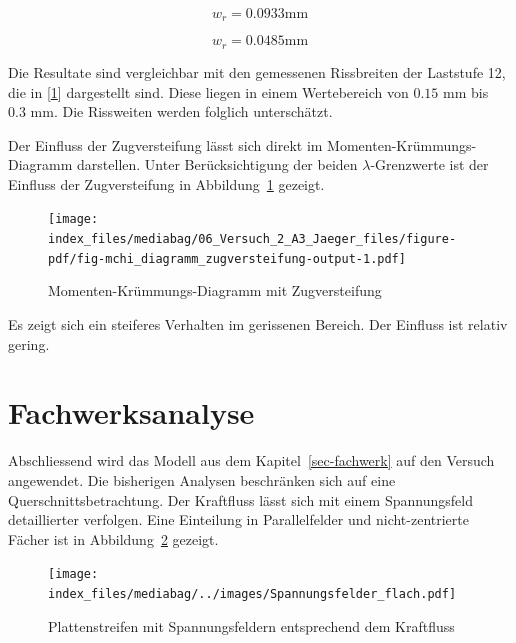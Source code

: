 \documentclass[
  12pt,
  letterpaper,
  egregdoesnotlikesansseriftitles]{scrreprt}
\begin{document}
\begin{equation}w_{r} = 0.0933 \text{mm}\end{equation}

\begin{equation}w_{r} = 0.0485 \text{mm}\end{equation}

Die Resultate sind vergleichbar mit den gemessenen Rissbreiten der
Laststufe 12, die in {[}\protect\hyperlink{ref-Jaeger2006}{1}{]}
dargestellt sind. Diese liegen in einem Wertebereich von
\(0.15 \text{ mm}\) bis \(0.3 \text{ mm}\). Die Rissweiten werden
folglich unterschätzt.

Der Einfluss der Zugversteifung lässt sich direkt im
Momenten-Krümmungs-Diagramm darstellen. Unter Berücksichtigung der
beiden \(\lambda\)-Grenzwerte ist der Einfluss der Zugversteifung in
Abbildung~\ref{fig-mchi_diagramm_zugversteifung} gezeigt.

\begin{figure}[H]

{\centering \texttt{[image: index\_files/mediabag/06\_Versuch\_2\_A3\_Jaeger\_files/figure-pdf/fig-mchi\_diagramm\_zugversteifung-output-1.pdf]}

}

\caption{\label{fig-mchi_diagramm_zugversteifung}Momenten-Krümmungs-Diagramm
mit Zugversteifung}

\end{figure}

Es zeigt sich ein steiferes Verhalten im gerissenen Bereich. Der
Einfluss ist relativ gering.

\hypertarget{fachwerksanalyse}{%
\section{Fachwerksanalyse}\label{fachwerksanalyse}}

Abschliessend wird das Modell aus dem Kapitel~\ref{sec-fachwerk} auf den
Versuch angewendet. Die bisherigen Analysen beschränken sich auf eine
Querschnittsbetrachtung. Der Kraftfluss lässt sich mit einem
Spannungsfeld detaillierter verfolgen. Eine Einteilung in Parallelfelder
und nicht-zentrierte Fächer ist in
Abbildung~\ref{fig-spannungsfelder_flach} gezeigt.

\begin{figure}[H]

{\centering \texttt{[image: index\_files/mediabag/../images/Spannungsfelder\_flach.pdf]}

}

\caption{\label{fig-spannungsfelder_flach}Plattenstreifen mit
Spannungsfeldern entsprechend dem Kraftfluss}

\end{figure}
\end{document}
